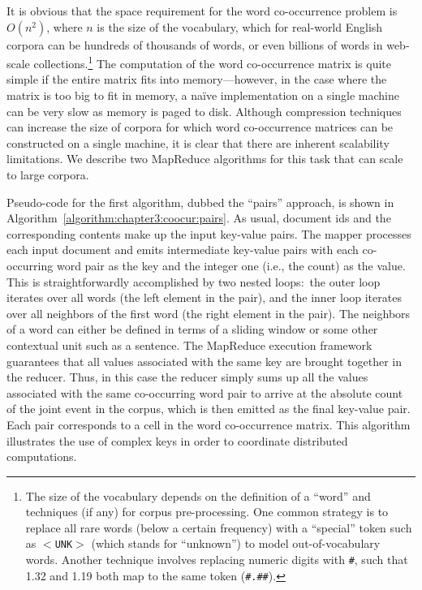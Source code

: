 It is obvious that the space requirement for the word co-occurrence
problem is $O(n^2)$, where $n$ is the size of the vocabulary, which
for real-world English corpora can be hundreds of thousands of words,
or even billions of words in web-scale collections.\footnote{The size
  of the vocabulary depends on the definition of a ``word'' and
  techniques (if any) for corpus pre-processing.  One common strategy
  is to replace all rare words (below a certain frequency) with a
  ``special'' token such as \texttt{$<$UNK$>$} (which stands for
  ``unknown'') to model out-of-vocabulary words.  Another technique
  involves replacing numeric digits with \texttt{\#}, such that 1.32 and
  1.19 both map to the same token (\texttt{\#.\#\#}).}  The computation
of the word co-occurrence matrix is quite simple if the entire matrix
fits into memory---however, in the case where the matrix is too big to
fit in memory, a na\"{i}ve implementation on a single machine can be
very slow as memory is paged to disk.  Although compression techniques
can increase the size of corpora for which word co-occurrence matrices
can be constructed on a single machine, it is clear that there are
inherent scalability limitations.  We describe two MapReduce
algorithms for this task that can scale to large corpora.

Pseudo-code for the first algorithm, dubbed the ``pairs'' approach, is
shown in Algorithm~\ref{algorithm:chapter3:coocur:pairs}.  As usual,
document ids and the corresponding contents make up the input
key-value pairs.  The mapper processes each input document and emits
intermediate key-value pairs with each co-occurring word pair as the
key and the integer one (i.e., the count) as the value.  This is
straightforwardly accomplished by two nested loops:\ the outer loop
iterates over all words (the left element in the pair), and the inner
loop iterates over all neighbors of the first word (the right element
in the pair).  The neighbors of a word can either be defined in terms
of a sliding window or some other contextual unit such as a sentence.
The MapReduce execution framework guarantees that all values
associated with the same key are brought together in the reducer.
Thus, in this case the reducer simply sums up all the values
associated with the same co-occurring word pair to arrive at the
absolute count of the joint event in the corpus, which is then emitted
as the final key-value pair. Each pair corresponds to a cell in the
word co-occurrence matrix.  This algorithm illustrates the use of
complex keys in order to coordinate distributed computations.

